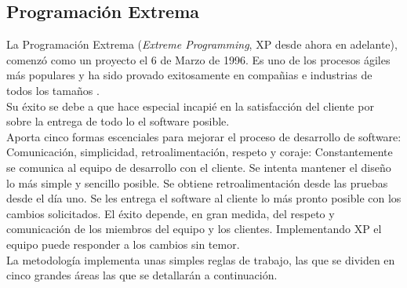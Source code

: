 \subsection{Programación Extrema}
\label{subsec:XP}
La Programación Extrema (\textit{Extreme Programming}, XP desde ahora en adelante), comenzó como un proyecto el 6 de Marzo de 1996. Es uno de los procesos ágiles más populares y ha sido provado exitosamente en compañias e industrias de todos los tamaños \cite{xP}.\\

Su éxito se debe a que hace especial incapié en la satisfacción del cliente por sobre la entrega de todo lo el software posible.\\

Aporta cinco formas escenciales para mejorar el proceso de desarrollo de software: Comunicación, simplicidad, retroalimentación, respeto y coraje: Constantemente se comunica al equipo de desarrollo con el cliente. Se intenta mantener el diseño lo más simple y sencillo posible. Se obtiene retroalimentación desde las pruebas desde el día uno. Se les entrega el software al cliente lo más pronto posible con los cambios solicitados. El éxito depende, en gran medida, del respeto y comunicación de los miembros del equipo y los clientes. Implementando XP el equipo puede responder a los cambios sin temor.\\

La metodología implementa unas simples reglas de trabajo, las que se dividen en cinco grandes áreas las que se detallarán a continuación.\\

